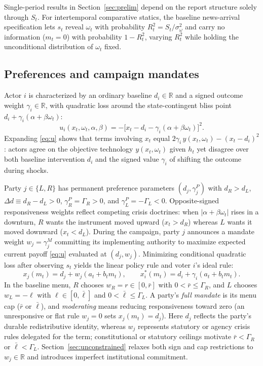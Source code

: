\documentclass[11pt,letterpaper]{article}
\newcommand{\Dd}{\Delta d}
\begin{document}
Single-period results in Section~\ref{sec:prelim} depend on the report structure solely through $S_t$. For intertemporal comparative statics, the baseline news-arrival specification lets $s_t$ reveal $\omega_t$ with probability $R_t^2=S_t/\sigma_\omega^2$ and carry no information ($m_t=0$) with probability $1-R_t^2$, varying $R_t^2$ while holding the unconditional distribution of $\omega_t$ fixed.

\subsection{Preferences and campaign mandates}

Actor $i$ is characterized by an ordinary baseline $d_i\in\mathbb R$ and a signed outcome weight $\gamma_i\in\mathbb R$, with quadratic loss around the state-contingent bliss point $d_i+\gamma_i(\alpha+\beta\omega_t)$:
\begin{equation}
 u_i(x_t,\omega_t,\alpha,\beta)
   =-\big[x_t-d_i-\gamma_i(\alpha+\beta\omega_t)\big]^2 .
 \label{eq:u}
\end{equation}
Expanding \eqref{eq:u} shows that terms involving $x_t$ equal $2\gamma_i\,y(x_t,\omega_t)-(x_t-d_i)^2$: actors agree on the objective technology $y(x_t,\omega_t)$ given $h_t$ yet disagree over both baseline intervention $d_i$ and the signed value $\gamma_i$ of shifting the outcome during shocks.

Party $j\in\{L,R\}$ has permanent preference parameters $(d_j,\gamma_j^P)$ with $d_R>d_L$, $\Dd\equiv d_R-d_L>0$, $\gamma_R^P=\Gamma_R>0$, and $\gamma_L^P=-\Gamma_L<0$. Opposite-signed responsiveness weights reflect competing crisis doctrines: when $|\alpha+\beta\omega_t|$ rises in a downturn, $R$ wants the instrument moved upward ($x_t>d_R$) whereas $L$ wants it moved downward ($x_t<d_L$). During the campaign, party $j$ announces a mandate weight $w_j=\gamma_j^M$ committing its implementing authority to maximize expected current payoff \eqref{eq:u} evaluated at $(d_j,w_j)$. Minimizing conditional quadratic loss after observing $s_t$ yields the linear policy rule and voter $i$'s ideal rule:
\begin{equation}
 x_j(m_t)=d_j+w_j(a_t+b_t m_t),\qquad
 x_i^*(m_t)=d_i+\gamma_i(a_t+b_t m_t).
 \label{eq:rule}
\end{equation}
In the baseline menu, $R$ chooses $w_R=r\in[0,\bar r]$ with $0<\bar r\le\Gamma_R$, and $L$ chooses $w_L=-\ell$ with $\ell\in[0,\bar\ell]$ and $0<\bar\ell\le\Gamma_L$. A party's \emph{full mandate} is its menu cap ($\bar r$ or $\bar\ell$), and \emph{moderating} means reducing responsiveness toward zero (an unresponsive or flat rule $w_j=0$ sets $x_j(m_t)=d_j$). Here $d_j$ reflects the party's durable redistributive identity, whereas $w_j$ represents statutory or agency crisis rules delegated for the term; constitutional or statutory ceilings motivate $\bar r<\Gamma_R$ or $\bar\ell<\Gamma_L$. Section~\ref{sec:unconstrained} relaxes both sign and cap restrictions to $w_j\in\mathbb R$ and introduces imperfect institutional commitment.
\end{document}
